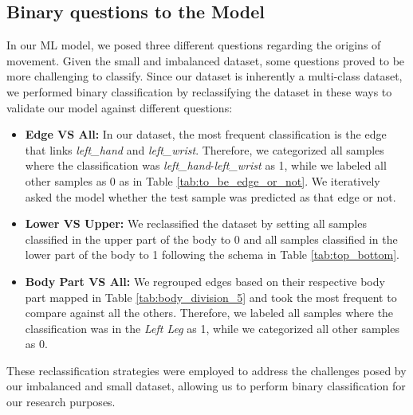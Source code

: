 \subsection{Binary questions to the Model}

In our ML model, we posed three different questions regarding the origins of movement. 
Given the small and imbalanced dataset, some questions proved to be more challenging to classify. 
Since our dataset is inherently a multi-class dataset, we performed binary classification by reclassifying the dataset in these ways to validate our model against different questions:

\begin{itemize}

    \item \textbf{Edge VS All:} In our dataset, the most frequent classification is the edge that links \textit{left\_hand} and \textit{left\_wrist}. 
    Therefore, we categorized all samples where the classification was \textit{left\_hand}-\textit{left\_wrist} as 1, while we labeled all other samples as 0 as in Table \ref{tab:to_be_edge_or_not}. 
    We iteratively asked the model whether the test sample was predicted as that edge or not.  
    
    \item \textbf{Lower VS Upper:} We reclassified the dataset by setting all samples classified in the upper part of the body to 0 and all samples classified in the lower part of the body to 1 following the schema in Table \ref{tab:top_bottom}.
    
    \item \textbf{Body Part VS All:} We regrouped edges based on their respective body part mapped in Table \ref{tab:body_division_5} and took the most frequent to compare against all the others.
    Therefore, we labeled all samples where the classification was in the \textit{Left Leg} as 1, while we categorized all other samples as 0.

\end{itemize}
These reclassification strategies were employed to address the challenges posed by our imbalanced and small dataset, allowing us to perform binary classification for our research purposes.

